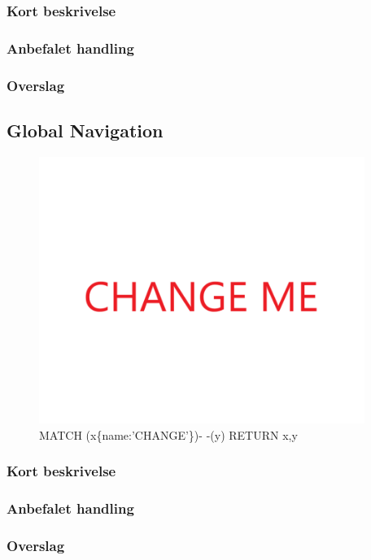\documentclass{article}
\begin{document}
\subsubsection{Kort beskrivelse}
\subsubsection{Anbefalet handling}
\subsubsection{Overslag}
\subsection{Global Navigation}
\begin{figure}[h]
\includegraphics[width=300pt]{CHANGE.PNG}
\caption{MATCH (x\{name:'CHANGE'\})- -(y) RETURN x,y}
\end{figure}
\subsubsection{Kort beskrivelse}
\subsubsection{Anbefalet handling}
\subsubsection{Overslag}
\end{document}
